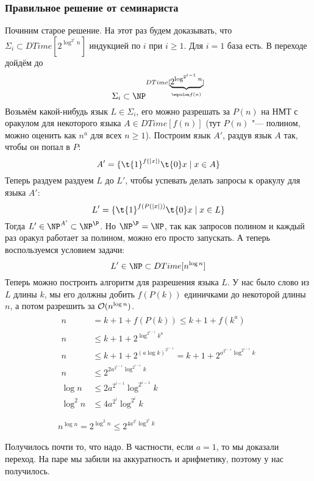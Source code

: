 	\subsubsection{Правильное решение от семинариста}
		Починим старое решение.
		На этот раз будем доказывать, что $\Sigma_i \subset DTime[2^{\log^{2^i} n}]$ индукцией по $i$ при $i\ge 1$.
		Для $i = 1$ база есть.
		В переходе дойдём до
		\[ \Sigma_i \subset \NP^{DTime[\underbrace{2^{\log^{2^{i-1}} n}}_{\eqcolon f(n)}]} \]
		Возьмём какой-нибудь язык $L\in\Sigma_i$, его можно разрешать за $P(n)$ на НМТ
		с оракулом для некоторого языка $A \in DTime[f(n)]$ (тут $P(n)$ "--- полином, можно оценить как $n^a$ для всех $n \ge 1$).
		Построим язык $A'$, раздув язык $A$ так, чтобы он попал в $P$:
		\[ A' = \{ \t{1}^{f(|x|)}\t{0}x \mid x \in A \} \]
		Теперь раздуем раздуем $L$ до $L'$, чтобы успевать делать запросы к оракулу для языка $A'$:
		\[
			L' = \{ \t{1}^{f(P(|x|))}\t{0} x \mid x \in L \}
		\]
		Тогда $L' \in \NP^{A'} \subset \NP^\P$.
		Но $\NP^\P=\NP$, так как запросов полином и каждый раз оракул работает за полином, можно его просто запускать.
		А теперь воспользуемся условием задачи:
		\[ L' \in \NP \subset DTime[n^{\log n}] \]
		Теперь можно построить алгоритм для разрешения языка $L$.
		У нас было слово из $L$ длины $k$, мы его должны добить $f(P(k))$ единичками до некоторой длины $n$, а потом разрешить за $\mathcal O(n^{\log n})$.
		\begin{gather*}
			\begin{aligned}
				n &= k + 1 + f(P(k)) \le k + 1 + f(k^a) \\
				n &\le k + 1 + 2^{\log^{2^{i-1}} k^a} \\
				n &\le k + 1 + 2^{\left(a \log k\right)^{2^{i-1}}} =
					k + 1 + 2^{a^{2^{i-1}} \log^{2^{i-1}} k} \\
				n &\le 2^{2a^{2^{i-1}} \log^{2^{i-1}} k} \\
				\log n &\le 2a^{2^{i-1}} \log^{2^{i-1}} k \\
				\log^2 n &\le 4a^{2^i} \log^{2^i} k \\
			\end{aligned} \\
			n^{\log n} = 2^{\log^2n} \le 2^{4a^{2^i} \log^{2^i} k}
		\end{gather*}
		\TODO

		Получилось почти то, что надо.
		В частности, если $a=1$, то мы доказали переход.
		На паре мы забили на аккуратность и арифметику, поэтому у нас получилось.

